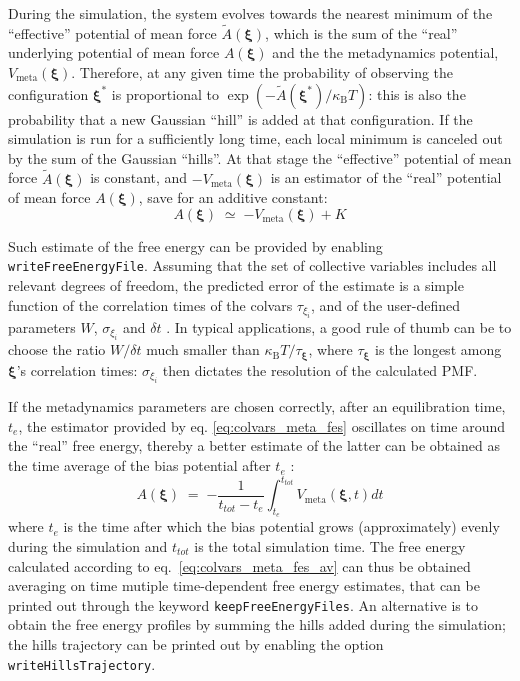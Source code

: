 During the simulation, the system evolves towards the nearest minimum of the ``effective'' potential of mean force $\tilde{A}(\bm{\xi})$, which is the sum of the ``real'' underlying potential of mean force $A(\bm{\xi})$  and the the metadynamics potential, $V_{\mathrm{meta}}(\bm{\xi})$.
Therefore, at any given time the probability of observing the configuration $\bm{\xi^{*}}$ is proportional to $\exp\left(-\tilde{A}(\bm{\xi^{*}})/\kappa_{\mathrm{B}}T\right)$: this is also the probability that a new Gaussian ``hill'' is added at that configuration.
If the simulation is run for a sufficiently long time, each local minimum is canceled out by the sum of the Gaussian ``hills''.
At that stage the ``effective'' potential of mean force $\tilde{A}(\bm{\xi})$ is constant, and $-V_{\mathrm{meta}}(\bm{\xi})$ is an estimator of the ``real'' potential of mean force $A(\bm{\xi})$,  save for an additive constant:
\begin{equation}
  \label{eq:colvars_meta_fes}
  A(\bm{\xi}) \; \simeq \; {
    -V_{\mathrm{meta}}(\bm{\xi}) + K
  }
\end{equation}

Such estimate of the free energy can be provided by enabling \texttt{writeFreeEnergyFile}.
Assuming that the set of collective variables includes all relevant degrees of freedom, the predicted error of the estimate is a simple function of the correlation times of the colvars $\tau_{\xi_{i}}$, and of the user-defined parameters $W$, $\sigma_{\xi_{i}}$ and $\delta{}t$ \cite{Bussi2006}.
In typical applications, a good rule of thumb can be to choose the ratio $W/\delta{}t$ much smaller than $\kappa_{\mathrm{B}}T/\tau_{\bm{\xi}}$, where $\tau_{\bm{\xi}}$ is the longest among $\bm{\xi}$'s correlation times: $\sigma_{\xi_{i}}$ then dictates the resolution of the calculated PMF.

If the metadynamics parameters are chosen correctly, after an equilibration time, $t_{e}$, the estimator provided
by eq. \ref{eq:colvars_meta_fes} oscillates on time around the ``real'' free energy, thereby a better estimate of the latter can be obtained as the time average of the bias potential after $t_{e}$ \cite{Marinelli2009,Crespo2010}:
\begin{equation}
  \label{eq:colvars_meta_fes_av}
  A(\bm{\xi}) \; = \; {-\frac{1}{t_{tot}-t_{e}} \int_{t_{e}}^{t_{tot}} {
    V_{\mathrm{meta}}(\bm{\xi},t)dt}
  }
\end{equation}
where $t_{e}$ is the time after which the bias potential grows (approximately) evenly during the simulation and $t_{tot}$ is the total simulation time. The free energy calculated according to eq.~\ref{eq:colvars_meta_fes_av} can thus be obtained averaging on time mutiple time-dependent free energy estimates, that can be printed out through the keyword \texttt{keepFreeEnergyFiles}. An alternative is to obtain the free energy profiles by summing the hills added during the simulation; the hills trajectory can be printed out by enabling the option \texttt{writeHillsTrajectory}.

